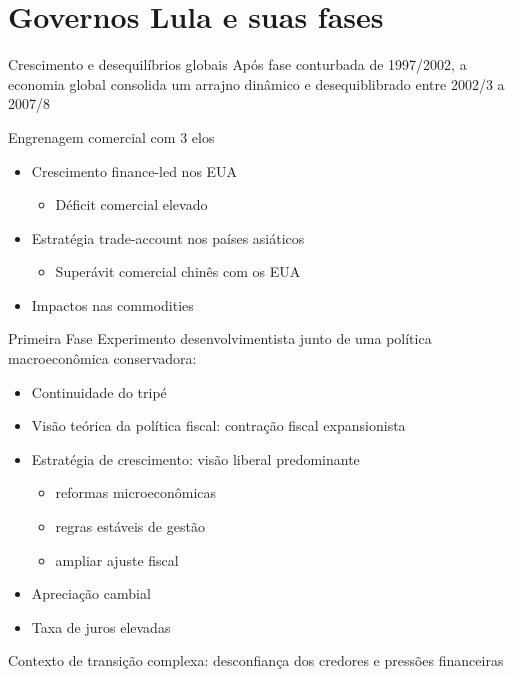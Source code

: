 \documentclass[presentation]{beamer}
\begin{document}
\section{Governos Lula e suas fases}
\label{sec:orgbd3c5c8}

\begin{frame}[label={sec:org5b29fb7}]{Crescimento e desequilíbrios globais \cite{carneiroSupremaciaDosMercados2006}}
Após fase conturbada de 1997/2002, a economia global consolida um arrajno dinâmico e desequiblibrado entre 2002/3 a 2007/8

\alert{Engrenagem comercial com 3 elos}
\begin{itemize}
\item Crescimento finance-led nos EUA
\begin{itemize}
\item Déficit comercial elevado
\end{itemize}
\item Estratégia trade-account nos países asiáticos
\begin{itemize}
\item Superávit comercial chinês com os EUA
\end{itemize}
\item Impactos nas commodities
\end{itemize}
\end{frame}

\begin{frame}[label={sec:orgdf3e68f}]{Primeira Fase}
Experimento desenvolvimentista junto de uma política macroeconômica conservadora:
\begin{itemize}
\item Continuidade do tripé
\item Visão teórica da \alert{política fiscal:} contração fiscal expansionista
\item \alert{Estratégia de crescimento:} visão liberal predominante
\begin{itemize}
\item reformas microeconômicas
\item regras estáveis de gestão
\item ampliar ajuste fiscal
\end{itemize}
\item Apreciação cambial
\item Taxa de juros elevadas
\end{itemize}

\alert{Contexto de transição complexa:} desconfiança dos credores e pressões financeiras
\end{frame}
\end{document}
